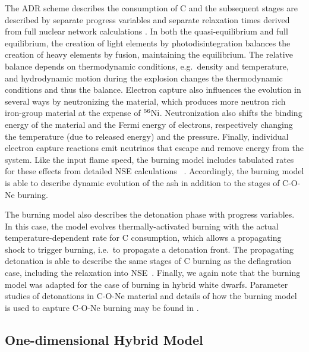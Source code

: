 \documentclass[preprint2]{aastex63}
\newcommand{\Ni}[1]{\ensuremath{{}^{#1}{\rm Ni}}}
\begin{document}
The ADR scheme describes the consumption of C and the subsequent stages
are described by separate progress variables and
separate relaxation times derived from full nuclear network calculations
\cite{Caldetal07,townetal2016}. In both the quasi-equilibrium and full equilibrium,
the creation of light elements by photodisintegration balances the creation of heavy
elements by fusion, maintaining the equilibrium. The relative balance depends on
thermodynamic conditions, e.g.\ density and temperature, and hydrodynamic motion
during the explosion changes the thermodynamic conditions and thus the
balance.
Electron capture also influences the evolution in several ways by
neutronizing the material, which produces more neutron rich iron-group
material at the expense of \Ni{56}. Neutronization also shifts the binding
energy of the material and the Fermi energy of electrons, respectively
changing the temperature (due to released energy) and the pressure.
Finally, individual electron capture reactions emit neutrinos that
escape and remove energy from the system.
Like the input flame speed, the burning model includes tabulated rates for these effects
from detailed NSE calculations ~\citep{SeitTownetal09}. Accordingly, the burning
model is able to describe dynamic evolution of the ash in addition to the
stages of C-O-Ne burning.

The burning model also describes the detonation phase with progress variables.
In this case, the model evolves thermally-activated burning with the actual
temperature-dependent rate for C consumption, which allows a propagating shock to
trigger burning, i.e.\ to propagate a detonation front. The propagating detonation
is able to describe the same stages of C burning as the deflagration case, including
the relaxation into NSE~\cite[and references therein]{townetal2016}. Finally,
we again note that the burning model was adapted for the case of burning in
hybrid white dwarfs.
{\color{blue} Parameter studies of detonations in C-O-Ne material and details of how the burning model is used to capture C-O-Ne burning may be found in \citet{willcoxetal2016}.}

\subsection{One-dimensional Hybrid Model}
\end{document}
